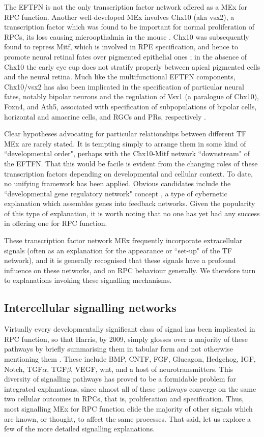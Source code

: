 The EFTFN is not the only transcription factor network offered as a MEx for RPC function. Another well-developed MEx involves Chx10 (aka vsx2), a transcription factor which was found to be important for normal proliferation of RPCs, its loss causing microopthalmia in the mouse \cite{Burmeister1996}. Chx10 was subsequently found to repress Mitf, which is involved in RPE specification, and hence to promote neural retinal fates over pigmented epithelial ones \cite{Horsford2004}; in the absence of Chx10 the early eye cup does not stratify properly between apical pigmented cells and the neural retina. Much like the multifunctional EFTFN components, Chx10/vsx2 has also been implicated in the specification of particular neural fates, notably bipolar neurons \cite{Burmeister1996} and the regulation of Vsx1 (a paralogue of Chx10), Foxn4, and Ath5, associated with specification of subpopulations of bipolar cells, horizontal and amacrine cells, and RGCs and PRs, respectively \cite{Clark2008,Vitorino2009}.

Clear hypotheses advocating for particular relationships between different TF MEx are rarely stated. It is tempting simply to arrange them in some kind of ``developmental order", perhaps with the Chx10-Mitf network ``downstream" of the EFTFN. That this would be facile is evident from the changing roles of these transcription factors depending on developmental and cellular context. To date, no unifying framework has been applied. Obvious candidates include the ``developmental gene regulatory network" concept \cite{Li2009}, a type of cybernetic explanation which assembles genes into feedback networks. Given the popularity of this type of explanation, it is worth noting that no one has yet had any success in offering one for RPC function.

These transcription factor network MEx frequently incorporate extracellular signals (often as an explanation for the appearance or ``set-up" of the TF network), and it is generally recognised that these signals have a profound influence on these networks, and on RPC behaviour generally. We therefore turn to explanations invoking these signalling mechanisms.

\subsection{Intercellular signalling networks}

Virtually every developmentally significant class of signal has been implicated in RPC function, so that Harris, by 2009, simply glosses over a majority of these pathways by briefly summarising them in tabular form and not otherwise mentioning them \cite{Agathocleous2009}. These include BMP, CNTF, FGF, Glucagon, Hedgehog, IGF, Notch, TGF$\alpha$, TGF$\beta$, VEGF, wnt, and a host of neurotransmitters. This diversity of signalling pathways has proved to be a formidable problem for integrated explanations, since almost all of these pathways converge on the same two cellular outcomes in RPCs, that is, proliferation and specification. Thus, most signalling MEx for RPC function elide the majority of other signals which are known, or thought, to affect the same processes. That said, let us explore a few of the more detailed signalling explanations.

